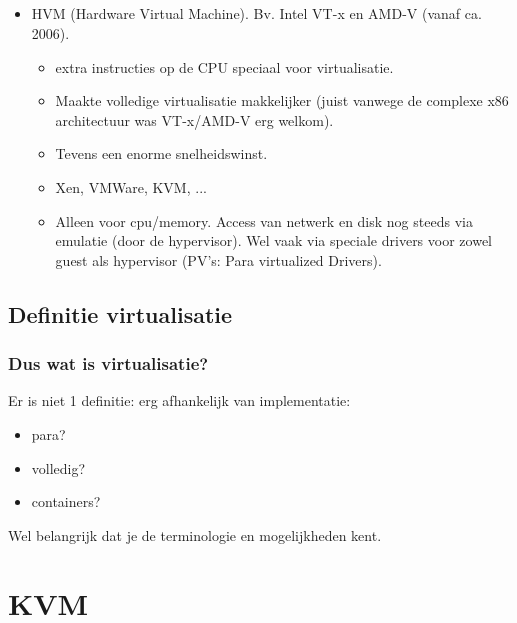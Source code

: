 \subsection {}
\begin{styleframe}
    \frametitle{}
\begin{itemize}
	\item HVM (Hardware Virtual Machine). Bv. Intel VT-x en AMD-V (vanaf ca. 2006).
	\pause
	\begin{itemize}
		\item extra instructies op de CPU speciaal voor virtualisatie.
		\pause
		\item Maakte volledige virtualisatie makkelijker (juist vanwege de complexe x86 architectuur was VT-x/AMD-V erg welkom).
		\pause
		\item Tevens een enorme snelheidswinst.
		\pause
		\item Xen, VMWare, KVM, ...
		\pause
		\item Alleen voor cpu/memory. Access van netwerk en disk nog steeds via emulatie (door de hypervisor). Wel vaak via speciale drivers voor zowel guest als hypervisor (PV's: Para virtualized Drivers).
	\end{itemize}
\end{itemize}
\end{styleframe}

\subsection {Definitie virtualisatie}
\begin{styleframe}
    \frametitle{Dus wat is virtualisatie?}
\pause
Er is niet 1 definitie: erg afhankelijk van implementatie:
\pause
\begin{itemize}
	\item para?
	\item volledig?
	\item containers?
\end{itemize}
\pause
Wel belangrijk dat je de terminologie en mogelijkheden kent.
\end{styleframe}

\section{KVM}

